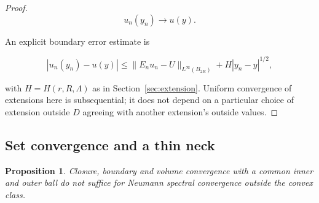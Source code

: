 \documentclass[11pt]{article}
\newtheorem{proposition}[theorem]{Proposition}
\theoremstyle{definition}
\theoremstyle{remark}
\numberwithin{equation}{section}
\begin{document}
\begin{proof}
\begin{equation}\label{eq:src-4-06}
u_n(y_n)\longrightarrow u(y).
\end{equation}

An explicit boundary error estimate is

\begin{equation}\label{eq:src-4-07}
|u_n(y_n)-u(y)|\le \|E_nu_n-U\|_{L^\infty(B_{2R})}+H|y_n-y|^{1/2},
\end{equation}

with $H=H(r,R,\Lambda)$ as in Section~\ref{sec:extension}. Uniform convergence of extensions here is subsequential; it does not depend on a particular choice of extension outside $D$ agreeing with another extension's outside values.
\end{proof}

\subsection{Set convergence and a thin neck}\label{subsec:neck}
\begin{proposition}\label{prop:neck}
Closure, boundary and volume convergence with a common inner and outer ball do not suffice for Neumann
spectral convergence outside the convex class.
\end{proposition}
\end{document}
